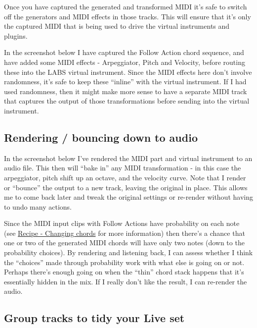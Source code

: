 \documentclass[
  12pt,
  letterpaper,
  oneside,
  open=any]{scrbook}
\makeatletter
\newcommand*\pandocbounded[1]{%
  \sbox\pandoc@box{#1}%
  \Gscale@div\@tempa{\textheight}{\dimexpr\ht\pandoc@box+\dp\pandoc@box\relax}%
  \Gscale@div\@tempb{\linewidth}{\wd\pandoc@box}%
  \ifdim\@tempb\p@<\@tempa\p@\let\@tempa\@tempb\fi%
  \ifdim\@tempa\p@<\p@\scalebox{\@tempa}{\usebox\pandoc@box}%
  \else\usebox{\pandoc@box}%
  \fi%
}
\makeatother
\begin{document}
Once you have captured the generated and transformed MIDI it's safe to
switch off the generators and MIDI effects in those tracks. This will
ensure that it's only the captured MIDI that is being used to drive the
virtual instruments and plugins.

In the screenshot below I have captured the Follow Action chord
sequence, and have added some MIDI effects - Arpeggiator, Pitch and
Velocity, before routing these into the LABS virtual instrument. Since
the MIDI effects here don't involve randomness, it's safe to keep these
``inline'' with the virtual instrument. If I had used randomness, then
it might make more sense to have a separate MIDI track that captures the
output of those transformations before sending into the virtual
instrument.

\pandocbounded{\texttt{[image: images/Workflow1\_MIDI.png]}}

\subsection{Rendering / bouncing down to
audio}\label{rendering-bouncing-down-to-audio}

In the screenshot below I've rendered the MIDI part and virtual
instrument to an audio file. This then will ``bake in'' any MIDI
transformation - in this case the arpeggiator, pitch shift up an octave,
and the velocity curve. Note that I render or ``bounce'' the output to a
new track, leaving the original in place. This allows me to come back
later and tweak the original settings or re-render without having to
undo many actions.

Since the MIDI input clips with Follow Actions have probability on each
note (see \hyperref[001-Recipe-Changing_Chords]{Recipe - Changing
chords} for more information) then there's a chance that one or two of
the generated MIDI chords will have only two notes (down to the
probability choices). By rendering and listening back, I can assess
whether I think the ``choices'' made through probability work with what
else is going on or not. Perhaps there's enough going on when the
``thin'' chord stack happens that it's essentially hidden in the mix. If
I really don't like the result, I can re-render the audio.

\subsection{Group tracks to tidy your Live
set}\label{group-tracks-to-tidy-your-live-set}
\end{document}
